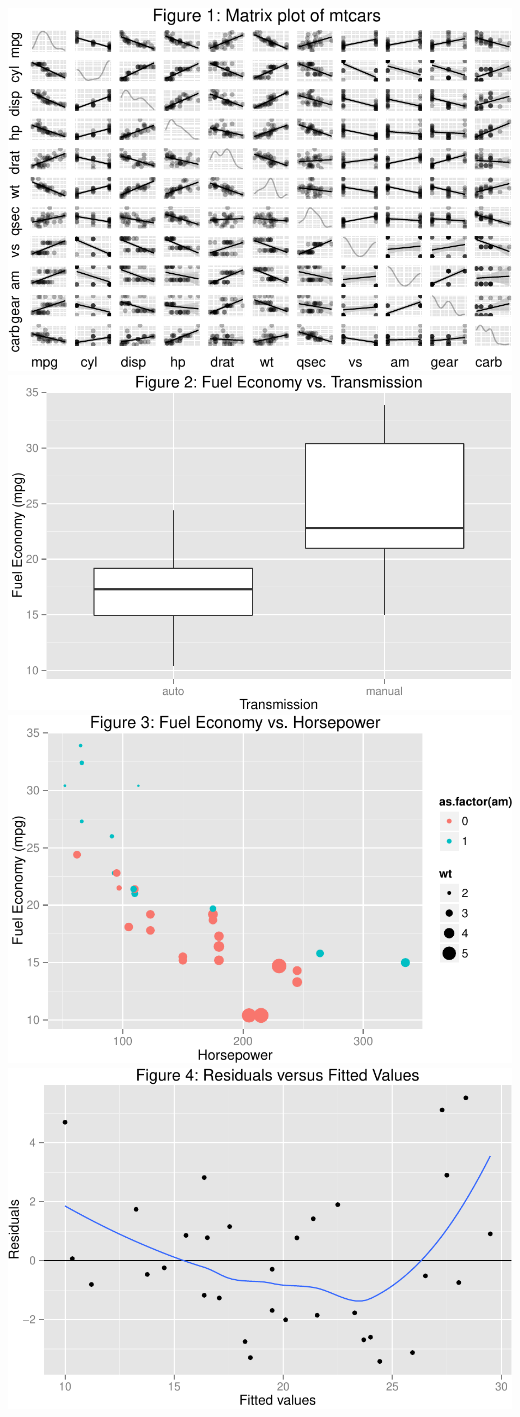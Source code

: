\documentclass[]{article}
\begin{document}
\includegraphics{./analysis_files/figure-latex/Figures1.pdf}
\includegraphics{./analysis_files/figure-latex/Figures2.pdf}
\includegraphics{./analysis_files/figure-latex/Figures3.pdf}
\includegraphics{./analysis_files/figure-latex/Figures4.pdf}
\end{document}
